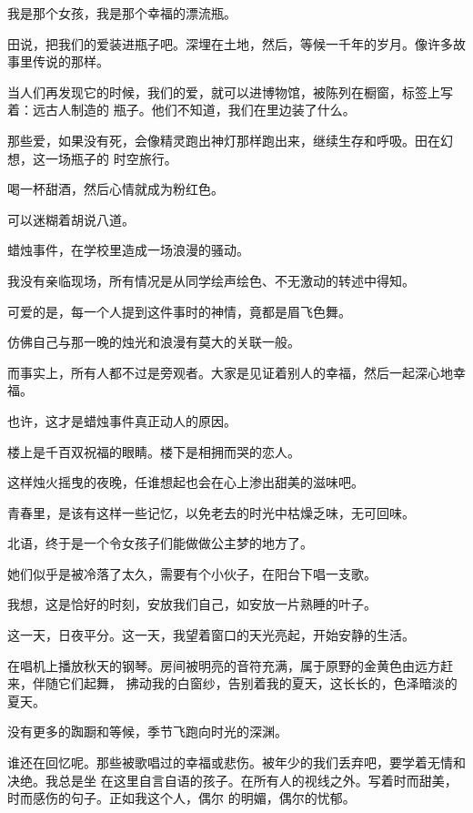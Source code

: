 		我是那个女孩，我是那个幸福的漂流瓶。

		田说，把我们的爱装进瓶子吧。深埋在土地，然后，等候一千年的岁月。像许多故事里传说的那样。

		当人们再发现它的时候，我们的爱，就可以进博物馆，被陈列在橱窗，标签上写着：远古人制造的
	瓶子。他们不知道，我们在里边装了什么。

		那些爱，如果没有死，会像精灵跑出神灯那样跑出来，继续生存和呼吸。田在幻想，这一场瓶子的
	时空旅行。

		喝一杯甜酒，然后心情就成为粉红色。

		可以迷糊着胡说八道。

	\endwriting



		蜡烛事件，在学校里造成一场浪漫的骚动。

		我没有亲临现场，所有情况是从同学绘声绘色、不无激动的转述中得知。

		可爱的是，每一个人提到这件事时的神情，竟都是眉飞色舞。

		仿佛自己与那一晚的烛光和浪漫有莫大的关联一般。

		而事实上，所有人都不过是旁观者。大家是见证着别人的幸福，然后一起深心地幸福。

		也许，这才是蜡烛事件真正动人的原因。

		楼上是千百双祝福的眼睛。楼下是相拥而哭的恋人。

		这样烛火摇曳的夜晚，任谁想起也会在心上渗出甜美的滋味吧。

		青春里，是该有这样一些记忆，以免老去的时光中枯燥乏味，无可回味。

		\vspace{1em}
		北语，终于是一个令女孩子们能做做公主梦的地方了。

		她们似乎是被冷落了太久，需要有个小伙子，在阳台下唱一支歌。

	\endwriting



		我想，这是恰好的时刻，安放我们自己，如安放一片熟睡的叶子。


		这一天，日夜平分。这一天，我望着窗口的天光亮起，开始安静的生活。

		在唱机上播放秋天的钢琴。房间被明亮的音符充满，属于原野的金黄色由远方赶来，伴随它们起舞，
	拂动我的白窗纱，告别着我的夏天，这长长的，色泽暗淡的夏天。

		没有更多的踟蹰和等候，季节飞跑向时光的深渊。

		谁还在回忆呢。那些被歌唱过的幸福或悲伤。被年少的我们丢弃吧，要学着无情和决绝。我总是坐
	在这里自言自语的孩子。在所有人的视线之外。写着时而甜美，时而感伤的句子。正如我这个人，偶尔
	的明媚，偶尔的忧郁。


